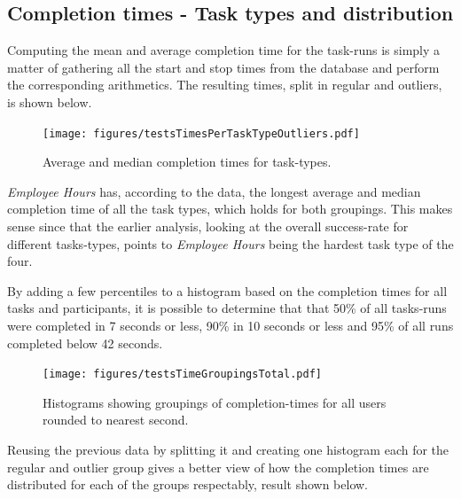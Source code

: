 \documentclass[nofilelist,dvipsnames]{cslthse-msc}
\begin{document}
%
      \subsection{Completion times - Task types and distribution}

        Computing the mean and average completion time for the task-runs is
        simply a matter of gathering all the start and stop times from the
        database and perform the corresponding arithmetics. The resulting times,
        split in regular and outliers, is shown below.

        \begin{figure}[h!]
          \centering
          \texttt{[image: figures/testsTimesPerTaskTypeOutliers.pdf]}
          \vspace{-0.3cm}
          \caption{Average and median completion times for task-types. }
          \label{label_testsTimesPerTaskTypeOutliers}
        \end{figure}


        \textit{Employee Hours} has, according to the data, the longest average
        and median completion time of all the task types, which holds for both
        groupings. This makes sense since that the earlier analysis, looking at
        the overall success-rate for different tasks-types, points to
        \textit{Employee Hours} being the hardest task type of the four.

        By adding a few percentiles to a histogram based on the completion times for all
        tasks and participants, it is possible to determine that that 50\% of
        all tasks-runs were completed in 7 seconds or less, 90\% in 10 seconds
        or less and 95\% of all runs completed below 42 seconds.

        \begin{figure}[h!]
          \centering
          \texttt{[image: figures/testsTimeGroupingsTotal.pdf]}
          \caption{
            Histograms showing groupings of completion-times for all users
            rounded to nearest second.
          }
        \end{figure}

        Reusing the previous data by splitting it and creating one histogram
        each for the regular and outlier group gives a better view of how the
        completion times are distributed for each of the groups respectably,
        result shown below.
\end{document}
